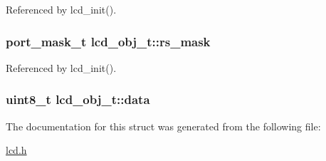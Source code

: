 Referenced by lcd\_\-init().\hypertarget{structlcd__obj__t_458e3fe9bac9f6bc0f3fa835c535e3c5}{
\subsubsection{\setlength{\rightskip}{0pt plus 5cm}port\_\-mask\_\-t {\bf lcd\_\-obj\_\-t::rs\_\-mask}}}
\label{structlcd__obj__t_458e3fe9bac9f6bc0f3fa835c535e3c5}




Referenced by lcd\_\-init().\hypertarget{structlcd__obj__t_b7c60cc77dfe924656e0ea6e36fec0d8}{
\subsubsection{\setlength{\rightskip}{0pt plus 5cm}uint8\_\-t {\bf lcd\_\-obj\_\-t::data}}}
\label{structlcd__obj__t_b7c60cc77dfe924656e0ea6e36fec0d8}




The documentation for this struct was generated from the following file:\begin{CompactItemize}
\item 
\hyperlink{lcd_8h}{lcd.h}\end{CompactItemize}
